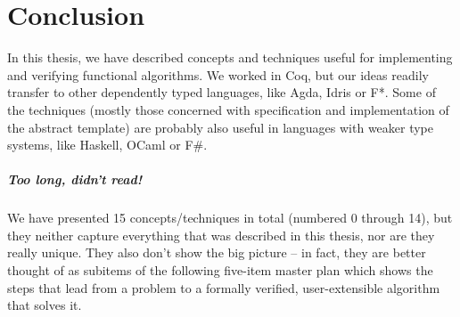 \documentclass[declaration,mgr,english,shortabstract]{iithesis}
\begin{document}
\chapter{Conclusion} \label{conclusion}

In this thesis, we have described concepts and techniques useful for implementing and verifying functional algorithms. We worked in Coq, but our ideas readily transfer to other dependently typed languages, like Agda, Idris or F*. Some of the techniques (mostly those concerned with specification and implementation of the abstract template) are probably also useful in languages with weaker type systems, like Haskell, OCaml or F\#.

\paragraph{Too long, didn't read!}{We have presented 15 concepts/techniques in total (numbered 0 through 14), but they neither capture everything that was described in this thesis, nor are they really unique. They also don't show the big picture -- in fact, they are better thought of as subitems of the following five-item master plan which shows the steps that lead from a problem to a formally verified, user-extensible algorithm that solves it.}
\end{document}
